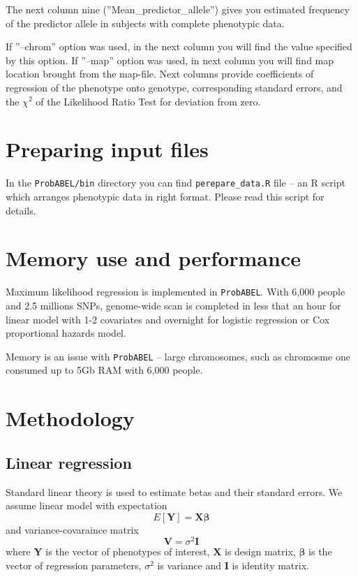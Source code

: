 \documentclass[12pt]{article}
\begin{document}
The next column nine (''Mean\_predictor\_allele'') gives you estimated 
frequency of the predictor allele in subjects with complete phenotypic data. 

If ''--chrom'' option was used, in the next column you will find the 
value specified by this option. If ''--map'' option was used, in next 
column you will find map location brought from the map-file. Next 
columns provide coefficients of regression  of the phenotype 
onto genotype, corresponding standard errors, and the $\chi^2$ 
of the Likelihood Ratio Test for deviation from zero.

\section{Preparing input files}

In the \texttt{ProbABEL/bin} directory you can find \texttt{perepare\_data.R}
file -- an R script which arranges phenotypic data in right format. 
Please read this script for details.

\section{Memory use and performance}

Maximum likelihood regression is implemented in \texttt{ProbABEL}. With 6,000 
people and 2.5 millions SNPs, genome-wide scan is completed in less 
that an hour for linear model with 1-2 covariates and overnight 
for logistic regression or Cox proportional hazards model.

Memory is an issue with \texttt{ProbABEL} -- large chromosomes, 
such as chromosme one consumed up to 5Gb RAM with 6,000 people. 

\section{Methodology}

\subsection{Linear regression}

Standard linear theory is used to estimate betas and their standard 
errors. We assume linear model with expectation
\begin{equation}
E[\mathbf{Y}] = \mathbf{X} \mathbf{\beta}
\end{equation}
and variance-covaraince matrix 
$$
\mathbf{V} = \sigma^2 \mathbf{I}
$$
where $\mathbf{Y}$ is the vector of phenotypes of interest, 
$\mathbf{X}$ is design matrix, $\mathbf{\beta}$ is the vector of regression 
parameters, $\sigma^2$ is variance and $\mathbf{I}$ is identity matrix. 
\end{document}
